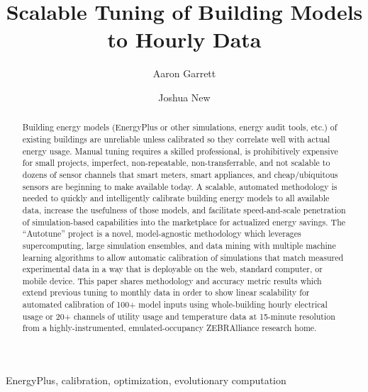 \documentclass[preprint, review, 12pt]{elsarticle}
\begin{document}
\begin{frontmatter}

\title{Scalable Tuning of Building Models to Hourly Data}

\author[atr:garrett]{Aaron Garrett}
\author[atr:new]{Joshua New}

\address[atr:garrett]{Mathematical, Computing, and Information Sciences, Jacksonville State University, Jacksonville, AL, USA}
\address[atr:new]{Oak Ridge National Laboratory, Oak Ridge, TN, USA}


\begin{abstract}
Building energy models (EnergyPlus or other simulations, energy audit tools, etc.) of existing buildings are unreliable unless calibrated so they correlate well with actual energy usage. Manual tuning requires a skilled professional, is prohibitively expensive for small projects, imperfect, non-repeatable, non-transferrable, and not scalable to dozens of sensor channels that smart meters, smart appliances, and cheap/ubiquitous sensors are beginning to make available today. A scalable, automated methodology is needed to quickly and intelligently calibrate building energy models to all available data, increase the usefulness of those models, and facilitate speed-and-scale penetration of simulation-based capabilities into the marketplace for actualized energy savings. The ``Autotune'' project is a novel, model-agnostic methodology which leverages supercomputing, large simulation ensembles, and data mining with multiple machine learning algorithms to allow automatic calibration of simulations that match measured experimental data in a way that is deployable on the web, standard computer, or mobile device. This paper shares methodology and accuracy metric results which extend previous tuning to monthly data in order to show linear scalability for automated calibration of 100+ model inputs using whole-building hourly electrical usage or 20+ channels of utility usage and temperature data at 15-minute resolution from a highly-instrumented, emulated-occupancy ZEBRAlliance research home.
\end{abstract}

\begin{keyword}
EnergyPlus, calibration, optimization, evolutionary computation
\end{keyword}

\end{frontmatter}
\end{document}
